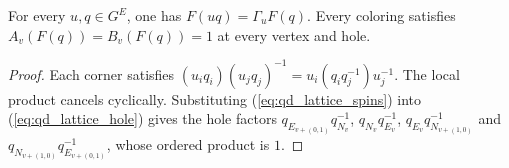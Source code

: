 \begin{lemma}
    \label{lem:peps_qd_lattice_spins_flat}
    For every $u,q\in G^E$, one has $F(uq)=\Gamma_u F(q)$.
    Every coloring satisfies $A_v(F(q))=B_v(F(q))=1$ at every vertex and hole.
\end{lemma}
\begin{proof}
    Each corner satisfies $(u_iq_i)(u_jq_j)^{-1}=u_i(q_iq_j^{-1})u_j^{-1}$.
    The local product cancels cyclically.
    Substituting (\ref{eq:qd_lattice_spins}) into (\ref{eq:qd_lattice_hole}) gives the hole factors
    $q_{E_{v+(0,1)}}q_{N_v}^{-1}$, $q_{N_v}q_{E_v}^{-1}$, $q_{E_v}q_{N_{v+(1,0)}}^{-1}$ and $q_{N_{v+(1,0)}}q_{E_{v+(0,1)}}^{-1}$, whose ordered product is $1$.
\end{proof}

